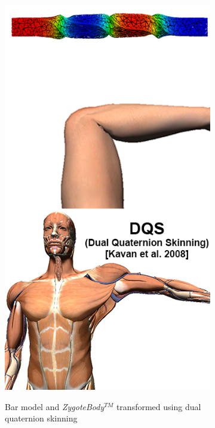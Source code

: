 \begin{figure}[ht]
    \null\hfill
     \begin{subfigure}[b]{0.32\linewidth}
        \centering
        {\includegraphics[width=\linewidth]{IMG/sDQS.png}}
        \caption{Bar model and \emph{ZygoteBody}$^{TM}$ transformed using dual quaternion skinning  \label{subfig:sDQS}}
    \end{subfigure}
    \null\hfill
     \begin{subfigure}[b]{0.32\linewidth}

\end{subfigure}
\end{figure}
